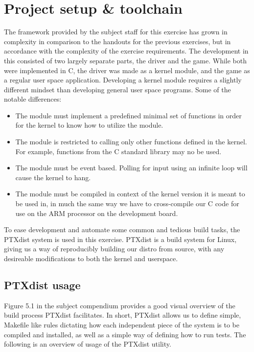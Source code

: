 \section{Project setup \& toolchain}
\label{project-setup-toolchain}

The framework provided by the subject staff for this exercise has grown in complexity in comparison to the handouts for the previous exercises, but in accordance with the complexity of the exercise requirements.
The development in this consisted of two largely separate parts, the driver and the game. While both were implemented in C, the driver was made as a kernel module, and the game as a regular user space application. Developing a kernel module requires a slightly different mindset than developing general user space programs. Some of the notable differences:

\begin{itemize}
\item The module must implement a predefined minimal set of functions in order for the kernel to know how to utilize the module.
\item The module is restricted to calling only other functions defined in the kernel. For example, functions from the C standard library may no be used.
\item The module must be event based. Polling for input using an infinite loop will cause the kernel to hang.
\item The module must be compiled in context of the kernel version it is meant to be used in, in much the same way we have to cross-compile our C code for use on the ARM processor on the development board.
\end{itemize}

To ease development and automate some common and tedious build tasks, the PTXdist system is used in this exercise. PTXdist is a build system for Linux, giving us a way of reproducibly building our distro from source, with any desireable modifications to both the kernel and userspace.

\subsection{PTXdist usage}

Figure 5.1 in the subject compendium \cite[p.~48]{compendium} provides a good visual overview of the build process PTXdist facilitates. In short, PTXdist allows us to define simple, Makefile like rules dictating how each independent piece of the system is to be compiled and installed, as well as a simple way of defining how to run tests. The following is an overview of usage of the PTXdist utility.

